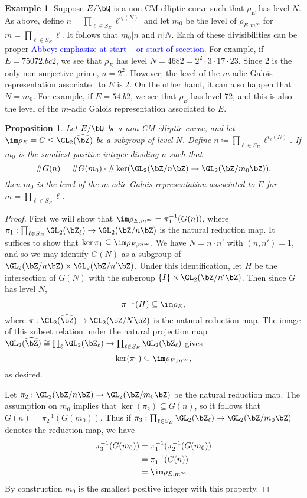 \documentclass[11pt,reqno]{amsart}
\theoremstyle{plain}
\newtheorem{proposition}[theorem]{Proposition}
\theoremstyle{definition}
\newtheorem{example}[theorem]{Example}
\newcommand{\Q}{\bQ}
\newcommand{\Z}{\bZ}
\newcommand{\abbey}[1]{\textcolor{blue}{Abbey: #1}}
\begin{document}
  \begin{example}
Suppose $E/\Q$ is a non-CM elliptic curve such that $\rho_{E}$ has level $N$. As above, define $n=\prod_{\ell \in S_E} \ell^{v_{\ell}(N)}$ and let $m_0$ be the level of $\rho_{E,m^{\infty}}$ for $m= \prod_{\ell \in S_E} \ell$. It follows that $m_0| n$ and $n | N$. Each of these divisibilities can be proper \abbey{emphasize at start -- or start of secction}. For example, if $E=75072.bc2$, we see that $\rho_E$ has level $N=4682=2^2 \cdot 3 \cdot 17 \cdot 23$. Since 2 is the only non-surjective prime, $n=2^2$. However, the level of the $m$-adic Galois representation associated to $E$ is 2. On the other hand, it can also happen that $N=m_0$. For example, if $E=54.b2$, we see that $\rho_E$ has level 72, and this is also the level of the $m$-adic Galois representation associated to $E$.
\end{example}
  \begin{proposition}
  Let $E/\Q$ be a non-CM elliptic curve, and let $\im \rho_E=G \leq \GL_2(\widehat{\Z})$ be a subgroup of level $N$. Define $n \coloneqq \prod_{\ell \in S_E} \ell^{v_{\ell}(N)}$. If $m_0$ is the smallest positive integer dividing $n$ such that \[\#G(n)=\#G(m_0) \cdot \#\ker(\GL_2(\Z/n\Z) \rightarrow \GL_2(\Z/m_0\Z)),\] then $m_0$ is the level of the $m$-adic Galois representation associated to $E$ for $m= \prod_{\ell \in S_E} \ell$.
  \end{proposition}
  \begin{proof}
  First we will show that $\im \rho_{E,m^{\infty}}=\pi_1^{-1}(G(n))$, where $\pi_1:\prod_{\ell \in S_E} \GL_2(\Z_{\ell}) \rightarrow \GL_2(\Z/n\Z)$ is the natural reduction map. It suffices to show that $\ker \pi_1 \subseteq \im \rho_{E,m^{\infty}}$. We have $N=n\cdot n'$ with $(n,n')=1$, and so we may identify $G(N)$ as a subgroup of $\GL_2(\Z/n\Z) \times \GL_2(\Z/n'\Z)$. Under this identification, let $H$  be the intersection of $G(N)$ with the subgroup $\{I\} \times \GL_2(\Z/n'\Z)$. Then since $G$ has level $N$,
  \[
  \pi^{-1}(H) \subseteq \im \rho_E,
  \]
  where $\pi: \GL_2(\widehat{\Z}) \rightarrow \GL_2(\Z/N\Z)$ is the natural reduction map. The image of this subset relation under the natural projection map  $\GL_2(\widehat{\Z}) \cong \prod_{\ell} \GL_2(\Z_{\ell}) \rightarrow  \prod_{\ell \in S_E} \GL_2(\Z_{\ell}) $ gives
  \[
  \ker(\pi_1) \subseteq \im \rho_{E,m^{\infty}},
  \]
  as desired.
  
Let $\pi_2: \GL_2(\Z/n\Z) \rightarrow \GL_2(\Z/m_0\Z)$ be the natural reduction map. The assumption on $m_0$ implies that $\ker(\pi_2) \subseteq G(n)$, so it follows that $G(n) = \pi_2^{-1}(G(m_0))$. Thus if $\pi_3: \prod_{\ell \in S_E} \GL_2(\Z_{\ell}) \rightarrow \GL_2(\Z/m_0\Z)$ denotes the reduction map, we have
  \begin{align*}
  \pi_3^{-1}(G(m_0))&=\pi_1^{-1}(\pi_2^{-1}(G(m_0))\\
  &=\pi_1^{-1}(G(n))\\
  &=\im \rho_{E,m^{\infty}}.
  \end{align*}
By construction $m_0$ is the smallest positive integer with this property.
  \end{proof}
  
\end{document}
